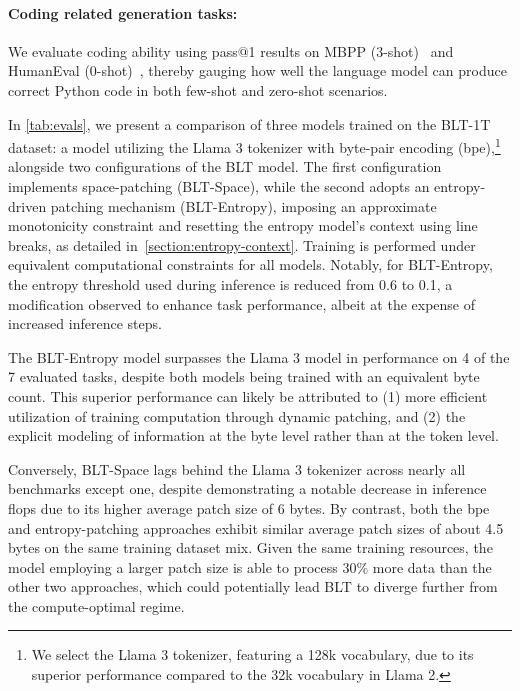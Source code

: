 \paragraph{Coding related generation tasks:} We evaluate coding ability using pass@1 results on MBPP (3-shot)~\citep{Eval_MBPP} and HumanEval (0-shot)~\citep{Eval_HumanEval}, thereby gauging how well the language model can produce correct Python code in both few-shot and zero-shot scenarios.

In \autoref{tab:evals}, we present a comparison of three models trained on the {\textsc BLT}-1T dataset: a model utilizing the Llama 3 tokenizer with byte-pair encoding (bpe),\footnote{We select the Llama 3 tokenizer, featuring a 128k vocabulary, due to its superior performance compared to the 32k vocabulary in Llama 2.} alongside two configurations of the {\textsc BLT} model. The first configuration implements space-patching ({\textsc BLT}-Space), while the second adopts an entropy-driven patching mechanism ({\textsc BLT}-Entropy), imposing an approximate monotonicity constraint and resetting the entropy model’s context using line breaks, as detailed in~\autoref{section:entropy-context}. Training is performed under equivalent computational constraints for all models. Notably, for {\textsc BLT}-Entropy, the entropy threshold used during inference is reduced from 0.6 to 0.1, a modification observed to enhance task performance, albeit at the expense of increased inference steps.

The {\textsc BLT}-Entropy model surpasses the Llama 3 model in performance on 4 of the 7 evaluated tasks, despite both models being trained with an equivalent byte count. This superior performance can likely be attributed to (1) more efficient utilization of training computation through dynamic patching, and (2) the explicit modeling of information at the byte level rather than at the token level.

Conversely, {\textsc BLT}-Space lags behind the Llama 3 tokenizer across nearly all benchmarks except one, despite demonstrating a notable decrease in inference flops due to its higher average patch size of 6 bytes. By contrast, both the bpe and entropy-patching approaches exhibit similar average patch sizes of about 4.5 bytes on the same training dataset mix. Given the same training resources, the model employing a larger patch size is able to process 30\% more data than the other two approaches, which could potentially lead {\textsc BLT} to diverge further from the compute-optimal regime.

